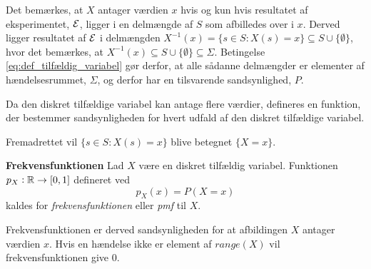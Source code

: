 





Det bemærkes, at $X$ antager værdien $x$ hvis og kun hvis resultatet af eksperimentet, $\mathcal{E}$, ligger i en delmængde af $S$ som afbilledes over i $x$. Derved ligger resultatet af $\mathcal{E}$ i delmængden $X^{-1}(x) = \{s\in S: X(s)=x\} \subseteq S\cup \{\emptyset\}$, hvor det bemærkes, at  $X^{-1}(x)\subseteq S\cup \{\emptyset\} \subseteq \Sigma$.
Betingelse \eqref{eq:def_tilfældig_variabel} gør derfor, at alle sådanne delmængder er elementer af hændelsesrummet, $\Sigma$, og derfor har en tilsvarende sandsynlighed, $P$.

Da den diskret tilfældige variabel kan antage flere værdier, defineres en funktion, der bestemmer sandsynligheden for hvert udfald af den diskret tilfældige variabel.

Fremadrettet vil $\{s\in S: X(s)=x\}$ blive betegnet $\{X=x\}$.

\begin{minipage}\textwidth
\begin{defn}\label{def:Frekvensfunktionen}\textbf{Frekvensfunktionen} %
\newline
    Lad $X$ være en diskret tilfældig variabel. %
    Funktionen $p_X:\mathbb{R}\to [0,1]$ defineret ved
%    
    $$ p_X(x) = P(X = x)$$
%    
    kaldes for \textit{frekvensfunktionen} eller \textit{pmf} til $X$.
\end{defn}
\end{minipage}

Frekvensfunktionen er derved sandsynligheden for at afbildingen $X$ antager værdien $x$.
Hvis en hændelse ikke er element af $range(X)$ vil frekvensfunktionen give $0$. 

